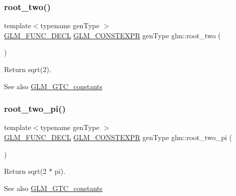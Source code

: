 \subsubsection{\texorpdfstring{root\+\_\+two()}{root\_two()}}
{\footnotesize\ttfamily template$<$typename gen\+Type $>$ \\
\mbox{\hyperlink{setup_8hpp_ab2d052de21a70539923e9bcbf6e83a51}{G\+L\+M\+\_\+\+F\+U\+N\+C\+\_\+\+D\+E\+CL}} \mbox{\hyperlink{setup_8hpp_a08b807947b47031d3a511f03f89645ad}{G\+L\+M\+\_\+\+C\+O\+N\+S\+T\+E\+X\+PR}} gen\+Type glm\+::root\+\_\+two (\begin{DoxyParamCaption}{ }\end{DoxyParamCaption})}

Return sqrt(2). \begin{DoxySeeAlso}{See also}
\mbox{\hyperlink{group__gtc__constants}{G\+L\+M\+\_\+\+G\+T\+C\+\_\+constants}} 
\end{DoxySeeAlso}
\mbox{\label{group__gtc__constants_ga2bcedc575039fe0cd765742f8bbb0bd3}} 
\subsubsection{\texorpdfstring{root\+\_\+two\+\_\+pi()}{root\_two\_pi()}}
{\footnotesize\ttfamily template$<$typename gen\+Type $>$ \\
\mbox{\hyperlink{setup_8hpp_ab2d052de21a70539923e9bcbf6e83a51}{G\+L\+M\+\_\+\+F\+U\+N\+C\+\_\+\+D\+E\+CL}} \mbox{\hyperlink{setup_8hpp_a08b807947b47031d3a511f03f89645ad}{G\+L\+M\+\_\+\+C\+O\+N\+S\+T\+E\+X\+PR}} gen\+Type glm\+::root\+\_\+two\+\_\+pi (\begin{DoxyParamCaption}{ }\end{DoxyParamCaption})}

Return sqrt(2 $\ast$ pi). \begin{DoxySeeAlso}{See also}
\mbox{\hyperlink{group__gtc__constants}{G\+L\+M\+\_\+\+G\+T\+C\+\_\+constants}} 
\end{DoxySeeAlso}
\mbox{\label{group__gtc__constants_ga3077c6311010a214b69ddc8214ec13b5}} 
